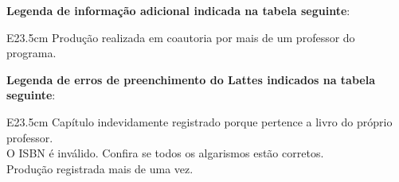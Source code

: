 \documentclass[12pt,brazil]{article}\usepackage[]{graphicx}\usepackage[]{xcolor}
\newcounter{tabela}
\begin{document}
\textbf{Legenda de informação adicional indicada na tabela seguinte}:

\begin{tabular}{E{23.5cm}}
Produção realizada em coautoria por mais de um professor do programa.\\
\end{tabular}


\textbf{Legenda de erros de preenchimento do Lattes indicados na tabela seguinte}:

\begin{tabular}{E{23.5cm}}
Capítulo indevidamente registrado porque pertence a livro do próprio professor.\\
O ISBN é inválido. Confira se todos os algarismos estão corretos.\\
Produção registrada mais de uma vez.\\
\end{tabular}
\end{document}
